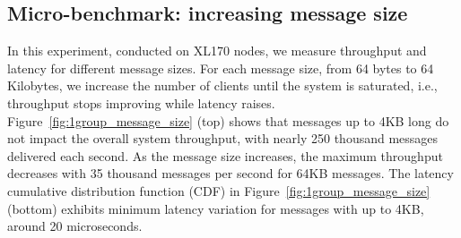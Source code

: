 \subsection{Micro-benchmark: increasing message size}
\label{sec:evaluation:micro}
In this experiment, conducted on XL170 nodes, we measure \libname throughput and latency for different message sizes.
For each message size, from 64 bytes to 64 Kilobytes, we increase the number of clients until the system is saturated, i.e., throughput stops improving while latency raises.
Figure~\ref{fig:1group_message_size} (top) shows that messages up to 4KB long do not impact the overall system throughput, with nearly 250 thousand messages delivered each second. 
As the message size increases, the maximum throughput decreases with 35 thousand messages per second for 64KB messages.
The latency cumulative distribution function (CDF) in Figure~\ref{fig:1group_message_size} (bottom) exhibits minimum latency variation for messages with up to 4KB, around 20 microseconds.

